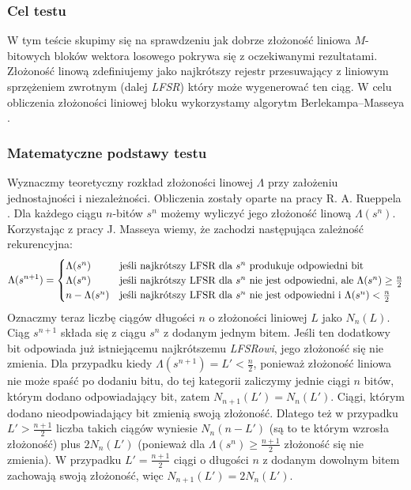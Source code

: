 \subsubsection{Cel testu}
W tym teście skupimy się na sprawdzeniu jak dobrze złożoność liniowa $M$-bitowych bloków wektora losowego pokrywa się z oczekiwanymi rezultatami. Złożoność linową zdefiniujemy jako najkrótszy rejestr przesuwający z liniowym sprzężeniem zwrotnym (dalej \emph{LFSR}) który może wygenerować ten ciąg. W celu obliczenia złożoności liniowej bloku wykorzystamy algorytm Berlekampa–Masseya \cite{mass}.
\subsubsection{Matematyczne podstawy testu}
Wyznaczmy teoretyczny rozkład złożoności linowej $\Lambda$ przy założeniu jednostajności i niezależności. Obliczenia zostały oparte na pracy R. A. Rueppela \cite{expected_lfsr}. Dla każdego ciągu $n$-bitów $s^n$ możemy wyliczyć jego złożoność linową $\Lambda(s^n)$. Korzystając z pracy J. Masseya \cite{mass} wiemy, że zachodzi następująca zależność rekurencyjna:
\begin{equation}
\label{eq:req_lfsr}
    \Lambda(s^{n+1}) = \begin{cases} 
    \Lambda(s^n) & \textrm{jeśli najkrótszy LFSR dla $s^n$ produkuje odpowiedni bit}\\
    \Lambda(s^n) & \textrm{jeśli najkrótszy LFSR dla $s^n$ nie jest odpowiedni, ale $ \Lambda(s^n) \geq \frac{n}{2}$}\\
    n -\Lambda(s^n) & \textrm{jeśli najkrótszy LFSR dla $s^n$ nie jest odpowiedni i $ \Lambda(s^n) < \frac{n}{2}$}\\
    \end{cases}
\end{equation}
Oznaczmy teraz liczbę ciągów długości $n$ o złożoności liniowej $L$ jako $N_n(L)$. Ciąg $s^{n+1}$ składa się z ciągu $s^{n}$ z dodanym jednym bitem. Jeśli ten dodatkowy bit odpowiada już istniejącemu najkrótszemu \emph{LFSRowi}, jego złożoność się nie zmienia. Dla przypadku kiedy $\Lambda(s^{n+1}) = L' < \frac{n}{2}$, ponieważ złożoność liniowa nie może spaść po dodaniu bitu, do tej kategorii zaliczymy jednie ciągi $n$ bitów, którym dodano odpowiadający bit, zatem $N_{n+1}(L')= N_{n}(L')$. Ciągi, którym dodano nieodpowiadający bit zmienią swoją złożoność. Dlatego też w przypadku $L' > \frac{n+1}{2}$ liczba takich ciągów wyniesie $N_{n}(n-L')$ (są to te którym wzrosła złożoność) plus $2N_{n}(L')$ (ponieważ dla $ \Lambda(s^n) \geq \frac{n+1}{2}$ złożoność się nie zmienia). W przypadku $L' = \frac{n+1}{2}$ ciągi o długości $n$ z dodanym dowolnym bitem zachowają swoją złożoność, więc $N_{n+1}(L') = 2N_{n}(L')$.
